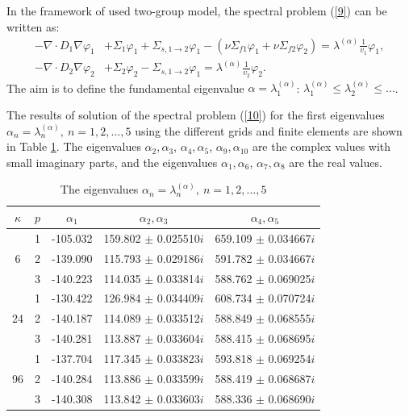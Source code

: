 \documentclass{llncs}
\begin{document}
In the framework of used two-group model, the spectral problem (\ref{9}) can be written as:
\begin{equation}\label{10}
\begin{split}
 - \nabla \cdot D_1 \nabla \varphi_1 & + \Sigma_1 \varphi_1 + \Sigma_{s,1\rightarrow 2} \varphi_1  
 - (\nu \Sigma_{f1} \varphi_1 + \nu \Sigma_{f2} \varphi_2) = \lambda^{(\alpha)} \frac{1}{v_1}   \varphi_1, \\
 - \nabla \cdot D_2 \nabla \varphi_2 & + \Sigma_2 \varphi_2 - \Sigma_{s,1\rightarrow 2} \varphi_1  
 = \lambda^{(\alpha)} \frac{1}{v_2}   \varphi_2.
\end{split}
\end{equation} 
The aim is to define the fundamental eigenvalue $\alpha = \lambda_1^{(\alpha)}$: $\lambda_1^{(\alpha)} \leq  \lambda_2^{(\alpha )} \leq ...$. 

The results of solution of the spectral problem (\ref{10}) for the first eigenvalues $\alpha_n = \lambda_n^{(\alpha)}, \ n = 1,2, ..., 5$
using the different grids and finite elements
are shown in Table \ref{t-2}. 
The eigenvalues $\alpha_2, \alpha_3$, $\alpha_4, \alpha_5$, $\alpha_9, \alpha_{10}$ are the complex values with small imaginary parts, and the eigenvalues $\alpha_1, \alpha_6$, $\alpha_7, \alpha_8$ are the real values.

\begin{table}[htp]
\caption{The eigenvalues $\alpha_n = \lambda_n^{(\alpha )}, \ n = 1,2, ..., 5$}
\label{t-2}
\begin{center}
\begin{tabular}{|c|c|c|c|c|}
\hline
$\kappa$ & $p$ & $\alpha_1$ &  $\alpha_2, \alpha_3$ &  $\alpha_4, \alpha_5$ \\ 
\hline
   & 1 & -105.032 & 159.802 $\pm$ 0.025510$i$  & 659.109 $\pm$ 0.034667$i$  \\
6  & 2 & -139.090 & 115.793 $\pm$ 0.029186$i$  & 591.782 $\pm$ 0.034667$i$  \\
   & 3 & -140.223 & 114.035 $\pm$ 0.033814$i$  & 588.762 $\pm$ 0.069025$i$  \\
\hline
   & 1 & -130.422 & 126.984 $\pm$ 0.034409$i$  & 608.734 $\pm$ 0.070724$i$  \\
24 & 2 & -140.187 & 114.089 $\pm$ 0.033512$i$  & 588.849 $\pm$ 0.068555$i$  \\
   & 3 & -140.281 & 113.887 $\pm$ 0.033604$i$  & 588.415 $\pm$ 0.068695$i$  \\
\hline
   & 1 & -137.704 & 117.345 $\pm$ 0.033823$i$  & 593.818 $\pm$ 0.069254$i$  \\
96 & 2 & -140.284 & 113.886 $\pm$ 0.033599$i$  & 588.419 $\pm$ 0.068687$i$  \\
   & 3 & -140.308 & 113.842 $\pm$ 0.033603$i$  & 588.336 $\pm$ 0.068690$i$  \\
\hline
\end{tabular}
\end{center}
\end{table}
\end{document}
